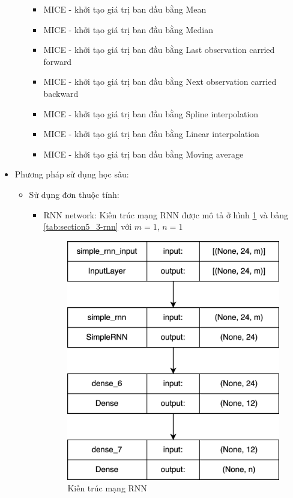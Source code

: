 \begin{itemize}
\begin{itemize}
\begin{itemize}
                    \item MICE - khởi tạo giá trị ban đầu bằng Mean
                    \item MICE - khởi tạo giá trị ban đầu bằng Median
                    \item MICE - khởi tạo giá trị ban đầu bằng Last observation carried forward 
                    \item MICE - khởi tạo giá trị ban đầu bằng Next observation carried backward
                    \item MICE - khởi tạo giá trị ban đầu bằng Spline interpolation
                    \item MICE - khởi tạo giá trị ban đầu bằng Linear interpolation
                    \item MICE - khởi tạo giá trị ban đầu bằng Moving average
                \end{itemize}
        \end{itemize}
    \item Phương pháp sử dụng học sâu:
        \begin{itemize}
            \item Sử dụng đơn thuộc tính:            
                \begin{itemize}
                    \item RNN network: Kiến trúc mạng RNN được mô tả ở hình \ref{fig:section5_3-rnn} và bảng \ref{tab:section5_3-rnn} với $m=1$, $n=1$

                    \begin{figure}[h!]
                        \centering
                        \includegraphics[width=0.6\linewidth]{image/section5_3/rnn.drawio.png}
                        \caption{Kiến trúc mạng RNN}
                        \label{fig:section5_3-rnn}
                    \end{figure}


\end{itemize}
\end{itemize}
\end{itemize}
